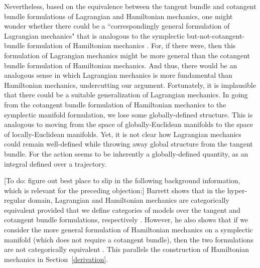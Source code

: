 \documentclass[letterpaper]{article}
\begin{document}
Nevertheless, based on the equivalence between the tangent bundle and cotangent bundle formulations of Lagrangian and Hamiltonian mechanics, one might wonder whether there could be a ``correspondingly general formulation of Lagrangian mechanics" that is analogous to the symplectic but-not-cotangent-bundle formulation of Hamiltonian mechanics \parencites[1182]{Barrett2}. For, if there were, then this formulation of Lagrangian mechanics might be more general than the cotangent bundle formulation of Hamiltonian mechanics. And thus, there would be an analogous sense in which Lagrangian mechanics is more fundamental than Hamiltonian mechanics, undercutting our argument. Fortunately, it is implausible that there could be a suitable generalization of Lagrangian mechanics. In going from the cotangent bundle formulation of Hamiltonian mechanics to the symplectic manifold formulation, we lose some globally-defined structure. This is analogous to moving from the space of globally-Euclidean manifolds to the space of locally-Euclidean manifolds. Yet, it is not clear how Lagrangian mechanics could remain well-defined while throwing away global structure from the tangent bundle. For the action seems to be inherently a globally-defined quantity, as an integral defined over a trajectory.

[To do: figure out best place to slip in the following background information, which is relevant for the preceding objection:] Barrett shows that in the hyper-regular domain, Lagrangian and Hamiltonian mechanics are categorically equivalent provided that we define categories of models over the tangent and cotangent bundle formulations, respectively \parencites*[1181-82]{Barrett2}. However, he also shows that if we consider the more general formulation of Hamiltonian mechanics on a symplectic manifold (which does not require a cotangent bundle), then the two formulations are not categorically equivalent \parencites*[1182-83]{Barrett2}. This parallels the construction of Hamiltonian mechanics in Section~\ref{derivation}.




\end{document}
